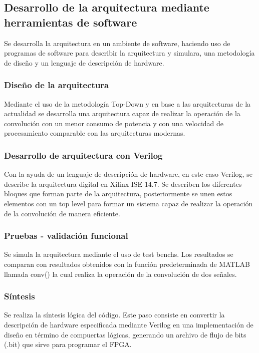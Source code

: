 \subsection{Desarrollo de la arquitectura mediante herramientas de software}
Se desarrolla la arquitectura en un ambiente de software, haciendo uso de programas de software para describir la arquitectura y simulara, una metodología de diseño y un lenguaje de descripción de hardware. 

\subsubsection{Diseño de la arquitectura}
Mediante el uso de la metodología Top-Down y en base a las arquitecturas de la actualidad se desarrolla una arquitectura capaz de realizar la operación de la convolución con un menor consumo de potencia y con una velocidad de procesamiento comparable con las arquitecturas modernas.  

\subsubsection{Desarrollo de arquitectura con Verilog}
Con la ayuda de un lenguaje de descripción de hardware, en este caso Verilog, se describe la arquitectura digital en Xilinx ISE 14.7. Se describen los diferentes bloques que forman parte de la arquitectura, posteriormente se unen estos elementos con un top level para formar un sistema capaz de realizar la operación de la convolución de manera eficiente. 

\subsubsection{Pruebas - validación funcional}
Se simula la arquitectura mediante el uso de test benchs. Los resultados se comparan con resultados obtenidos con la función predeterminada de MATLAB llamada conv() la cual realiza la operación de la convolución de dos señales.

\subsubsection{Síntesis}
Se realiza la síntesis lógica del código. Este paso consiste en convertir la descripción de hardware especificada mediante Verilog en una implementación de diseño en término de compuertas lógicas, generando un archivo de flujo de bits (.bit) que sirve para programar el FPGA. 

